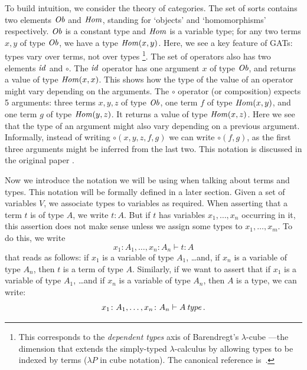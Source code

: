 To build intuition, we consider the theory of categories.
The set of sorts contains two elements $\operatorname{\mathit{Ob}}$ and $\operatorname{\mathit{Hom}}$, standing for `objects' and `homomorphisms' respectively.
$\operatorname{\mathit{Ob}}$ is a constant type and $\operatorname{\mathit{Hom}}$ is a variable type;
for any two terms $x, y$ of type $\operatorname{\mathit{Ob}}$, we have a type $\operatorname{\mathit{Hom}}(x,y)$.
Here, we see a key feature of GATs: types vary over terms, not over types%
\footnote{
  This corresponds to the \emph{dependent types} axis of Barendregt's
  \(\lambda\)-cube ---the dimension that extends the simply-typed
  \(\lambda\)-calculus by allowing types to be indexed by terms
  (\(\lambda P\) in cube notation).
  The canonical reference is~\cite{barendregt1992}.
}.
The set of operators also has two elements $\operatorname{\mathit{id}}$ and $\circ$.
The $\operatorname{\mathit{id}}$ operator has one argument $x$ of type $\operatorname{\mathit{Ob}}$,
and returns a value of type $\operatorname{\mathit{Hom}}(x, x)$. This shows
how the type of the value of an operator might vary depending
on the arguments. 
The $\circ$ operator (or composition) expects 5 arguments:
three terms $x, y, z$ of type $\operatorname{\mathit{Ob}}$, one term $f$ of type $\operatorname{\mathit{Hom}}(x, y)$,
and one term $g$ of type $\operatorname{\mathit{Hom}}(y, z)$. It returns
a value of type $\operatorname{\mathit{Hom}}(x, z)$.
Here we see that the type of an argument might also vary depending
on a previous argument.
Informally, instead of writing $\circ(x, y, z, f, g)$ we can
write $\circ(f, g)$, as the first three arguments might be inferred from the last two.
This notation is discussed in the original paper \cite{cartmell1986}. 

Now we introduce the notation we will be using when talking 
about terms and types. This notation will be formally defined
in a later section. Given a set of variables $V$,
we associate types to variables as required.
When asserting that a term $t$ is of type $A$, we write
$t \colon A$. But if $t$ has variables $x_1, \dots, x_n$ occurring in it, this assertion
does not make sense unless we assign some types to $x_1, \dots, x_m$.
To do this, we write 
\begin{equation*}
    x_1 \colon A_1, \dots, x_n \colon A_n \vdash t \colon A
\end{equation*}
that reads as follows: if $x_1$ is a variable of type $A_1$, \dots and, if $x_n$ is a variable of type $A_n$,
then $t$ is a term of type $A$. 
Similarly, if we want to assert that if $x_1$ is a variable of type $A_1$,
\dots and if $x_n$ is a variable of type $A_n$,
then $A$ is a type, we can write: 
\begin{equation*}
    x_1 \colon A_1, \dots, x_n \colon A_n \vdash A \operatorname{\mathit{\space type}}.    
\end{equation*}

